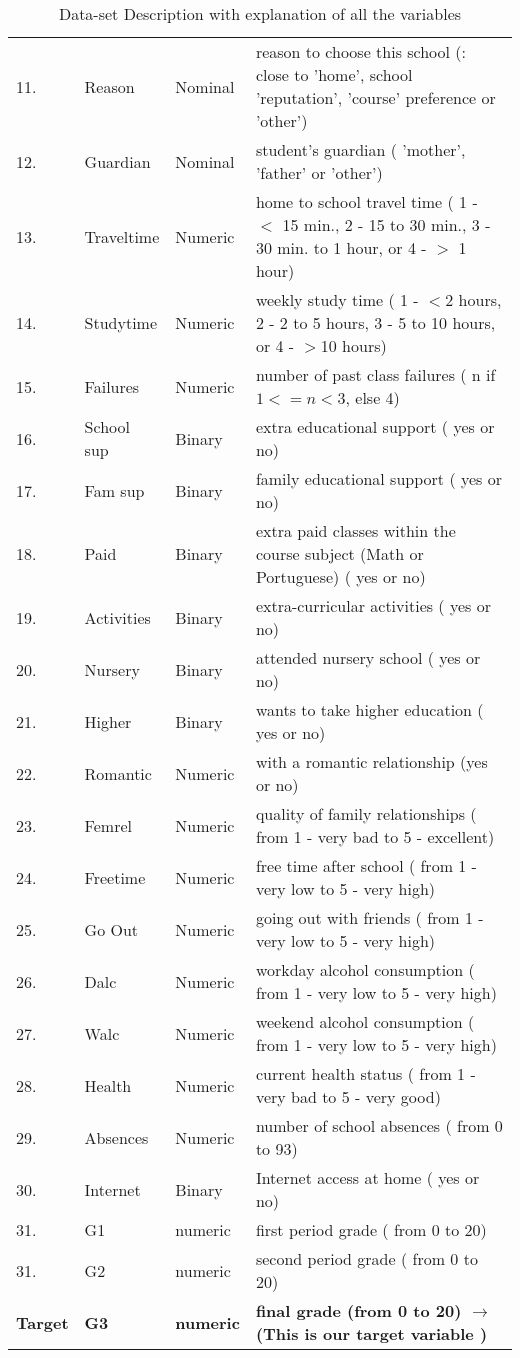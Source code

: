 \documentclass[A4paper,11pt]{report}
\begin{document}
\begin{table}[ht]
\begin{adjustbox}{width = 1\textwidth,center = \textwidth}
\begin{tabular}{||l|l|l|l||}
				11.&Reason & Nominal & reason to choose this school (: close to 'home', school 'reputation', 'course' preference or 'other')\\
				12.&Guardian & Nominal & student's guardian ( 'mother', 'father' or 'other')\\
				13.&Traveltime & Numeric & home to school travel time ( 1 - $<$ 15 min., 2 - 15 to 30 min., 3 - 30 min. to 1 hour, or 4 - $>$ 1 hour)\\
				14.&Studytime & Numeric & weekly study time ( 1 - $<$2 hours, 2 - 2 to 5 hours, 3 - 5 to 10 hours, or 4 - $>$10 hours)\\
				15.&Failures & Numeric & number of past class failures ( n if $1<=n<3$, else 4)\\
				16.&School sup & Binary & extra educational support ( yes or no)\\
				17.&Fam sup & Binary & family educational support ( yes or no)\\
				18.&Paid & Binary & extra paid classes within the course subject (Math or Portuguese) ( yes or no)\\
				19.&Activities & Binary & extra-curricular activities ( yes or no)\\
				20.&Nursery & Binary & attended nursery school ( yes or no)\\
				21.&Higher &	Binary & wants to take higher education ( yes or no)\\
				22.&Romantic & Numeric & with a romantic relationship (yes or no)\\
				23.&Femrel & Numeric & quality of family relationships ( from 1 - very bad to 5 - excellent)\\
				24.&Freetime & Numeric &	free time after school ( from 1 - very low to 5 - very high)\\
				25.&Go Out & Numeric & going out with friends ( from 1 - very low to 5 - very high)\\
				26.&Dalc & Numeric & workday alcohol consumption ( from 1 - very low to 5 - very high)\\
				27.&Walc & Numeric & weekend alcohol consumption ( from 1 - very low to 5 - very high)\\
				28.&Health & Numeric & current health status ( from 1 - very bad to 5 - very good)\\
				29.&Absences & Numeric & number of school absences ( from 0 to 93)\\
				30.&Internet & Binary & Internet access at home ( yes or no)\\
				31.&G1 & numeric & first period grade ( from 0 to 20)\\
				31.&G2 & numeric & second period grade ( from 0 to 20)\\
				\hline
				\hline
				\textbf{Target} & \textbf{G3} & \textbf{numeric} & \textbf{final grade (from 0 to 20) $\rightarrow$ (This is our target variable )}\\
				\hline
				\hline
			\end{tabular}
		\end{adjustbox}
	\caption{ Data-set Description with explanation of all the variables}
	\end{table}	
\end{document}
